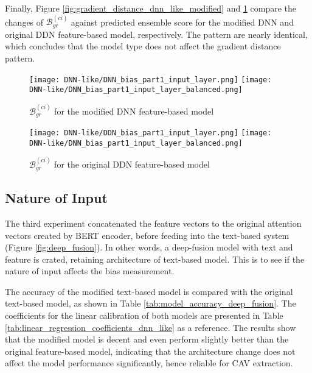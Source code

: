 Finally, Figure \ref{fig:gradient_distance_dnn_like_modified} and \ref{fig:gradient_distance_dnn_like_original} compare the changes of $\mathcal{B}^{(ci)}_{gr}$ against predicted ensemble score for the modified DNN and original DDN feature-based model, respectively. The pattern are nearly identical, which concludes that the model type does not affect the gradient distance pattern.

\begin{figure}[H]
    \centering
    \begin{minipage}[t]{0.48\textwidth}
        \centering
        \texttt{[image: DNN-like/DNN\_bias\_part1\_input\_layer.png]}
        \hfill
        \texttt{[image: DNN-like/DNN\_bias\_part1\_input\_layer\_balanced.png]}
        \caption{$\mathcal{B}^{(ci)}_{gr}$ for the modified DNN feature-based model}
        \label{fig:gradient_distance_dnn_like_modified}
    \end{minipage}
    \hfill
    \begin{minipage}[t]{0.48\textwidth}
        \centering
        \texttt{[image: DNN-like/DDN\_bias\_part1\_input\_layer.png]}
        \hfill
        \texttt{[image: DNN-like/DNN\_bias\_part1\_input\_layer\_balanced.png]}
        \caption{$\mathcal{B}^{(ci)}_{gr}$ for the original DDN feature-based model}
        \label{fig:gradient_distance_dnn_like_original}
    \end{minipage}
\end{figure}

\subsection{Nature of Input}
The third experiment concatenated the feature vectors to the original attention vectors created by BERT encoder, before feeding into the text-based system (Figure \ref{fig:deep_fusion}). In other words, a deep-fusion model with text and feature is crated, retaining architecture of text-based model. This is to see if the nature of input affects the bias measurement.

The accuracy of the modified text-based model is compared with the original text-based model, as shown in Table \ref{tab:model_accuracy_deep_fusion}. The coefficients for the linear calibration of both models are presented in Table \ref{tab:linear_regression_coefficients_dnn_like} as a reference. The results show that the modified model is decent and even perform slightly better than the original feature-based model, indicating that the architecture change does not affect the model performance significantly, hence reliable for CAV extraction.

